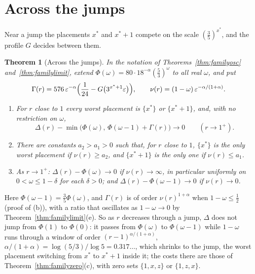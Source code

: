 \documentclass[11pt]{article}
\newtheorem{theorem}{Theorem}[section]
\begin{document}
\section{Across the jumps}\label{sec:jumps}

Near a jump the placements $x^*$ and $x^*+1$
compete on the scale $(\tfrac35)^{x^*}$, and the profile $G$ decides
between them.

\begin{theorem}[Across the jumps]\label{thm:familyjump}
In the notation of Theorems~\ref{thm:familyosc} and~\ref{thm:familylimit},
extend $\Phi(\omega)=80\cdot18^{-\alpha}(\tfrac53)^\omega$ to all real $\omega$, and put
\[
  \Gamma(r)=576\,\varepsilon^{-\alpha}\Bigl(\frac1{24}-G\bigl(3^{x^*+1}\varepsilon\bigr)\Bigr),
  \qquad\nu(r)=(1-\omega)\,\varepsilon^{-\alpha/(1+\alpha)} .
\]
\begin{enumerate}
\item[(a)] For $r$ close to $1$ every worst placement is $\{x^*\}$ or
$\{x^*+1\}$, and, with no restriction on $\omega$,
\[
  \Delta(r)-\min\bigl(\Phi(\omega),\,\Phi(\omega-1)+\Gamma(r)\bigr)\to0
  \qquad(r\to1^+).
\]
\item[(b)] There are constants $a_2>a_1>0$ such that, for $r$ close to $1$,
$\{x^*\}$ is the only worst placement if $\nu(r)\ge a_2$, and $\{x^*+1\}$ is
the only one if $\nu(r)\le a_1$.
\item[(c)] As $r\to1^+$: $\Delta(r)-\Phi(\omega)\to0$ if $\nu(r)\to\infty$,
in particular uniformly on $0<\omega\le1-\delta$ for each $\delta>0$; and
$\Delta(r)-\Phi(\omega-1)\to0$ if $\nu(r)\to0$.
\end{enumerate}
\end{theorem}

Here $\Phi(\omega-1)=\tfrac35\Phi(\omega)$, and $\Gamma(r)$ is of order
$\nu(r)^{1+\alpha}$ when $1-\omega\le\tfrac12$ (proof of (b)), with a ratio
that oscillates as $1-\omega\to0$ by Theorem~\ref{thm:familylimit}(e).  So as $r$
decreases through a jump, $\Delta$ does not jump from $\Phi(1)$ to $\Phi(0)$:
it passes from $\Phi(\omega)$ to $\Phi(\omega-1)$ while $1-\omega$ runs
through a window of order $(r-1)^{\alpha/(1+\alpha)}$,
$\alpha/(1+\alpha)=\log(5/3)/\log5=0.317\ldots$, which shrinks to the jump,
the worst placement switching from $x^*$ to $x^*+1$ inside it; the costs
there are those of Theorem~\ref{thm:familyzero}(c), with zero sets
$\{1,x,z\}$ or $\{1,z,x\}$.
\end{document}

